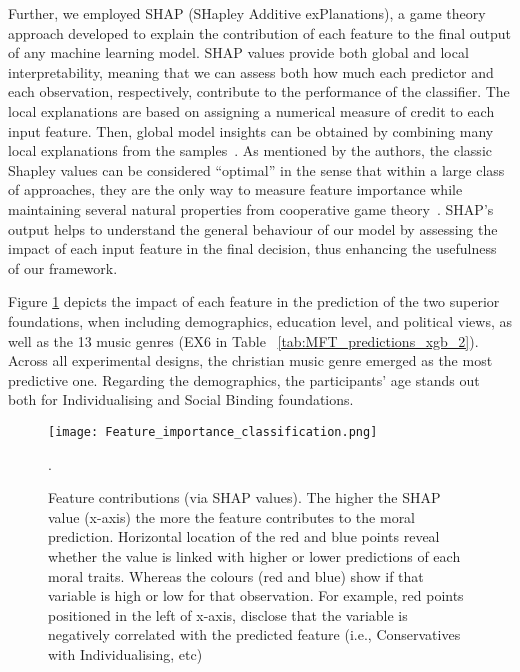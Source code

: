 \documentclass{article}
\begin{document}

Further, we employed SHAP (SHapley Additive exPlanations), a game theory approach developed to explain the contribution of each feature to the final output of any machine learning model. %
SHAP values provide both global and local interpretability, meaning that we can assess both how much each predictor and each observation, respectively, contribute to the performance of the classifier.
The local explanations are based on assigning a numerical measure
of credit to each input feature. Then, global model insights can be obtained by combining many local explanations from the samples~\cite{lundberg2019explainable}.
As mentioned by the authors, the classic Shapley
values can be considered ``optimal'' in the sense that within a large class of approaches, they are the only way
to measure feature importance while maintaining several natural properties from cooperative game theory~\cite{lundberg2017unified}.
SHAP's output helps to understand the general behaviour of our model by assessing the impact of each input feature in the final decision, thus enhancing the usefulness of our framework.


Figure \ref{fig:feature_importance} depicts the impact of each feature in the prediction of the two superior foundations, when including demographics, education level, and political views, as well as the 13 music genres (EX6 in Table ~\ref{tab:MFT_predictions_xgb_2}). 
Across all experimental designs, the christian music genre emerged as the most predictive one. Regarding the demographics, the participants' age stands out both for Individualising and Social Binding foundations. 


\begin{figure}[ht]
    \centering
    \texttt{[image: Feature\_importance\_classification.png]}
    \caption{Feature contributions (via SHAP values). The higher the SHAP value (x-axis) the more the feature contributes to the moral prediction.  Horizontal location of the red and blue points reveal whether the value is linked with higher or lower predictions of each moral traits. Whereas the colours (red and blue) show if that variable is high or low for that observation. For example, red points positioned in the left of x-axis, disclose that the variable is negatively correlated with the predicted feature (i.e., Conservatives with  Individualising, etc)}.
    \label{fig:feature_importance}
\end{figure}
\end{document}
